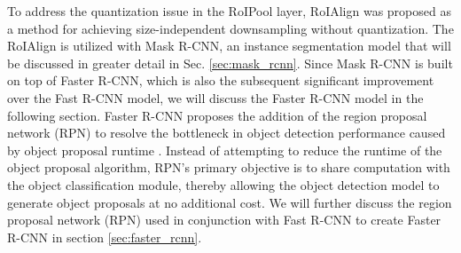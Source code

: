 To address the quantization issue in the RoIPool layer, RoIAlign was proposed as a method for achieving size-independent downsampling without quantization. The RoIAlign is utilized with Mask R-CNN, an instance segmentation model that will be discussed in greater detail in Sec. \ref{sec:mask_rcnn}. Since Mask R-CNN is built on top of Faster R-CNN, which is also the subsequent significant improvement over the Fast R-CNN model, we will discuss the Faster R-CNN model in the following section. Faster R-CNN proposes the addition of the region proposal network (RPN) to resolve the bottleneck in object detection performance caused by object proposal runtime \cite{faster_rcnn_2015}. Instead of attempting to reduce the runtime of the object proposal algorithm, RPN's primary objective is to share computation with the object classification module, thereby allowing the object detection model to generate object proposals at no additional cost. We will further discuss the region proposal network (RPN) used in conjunction with Fast R-CNN to create Faster R-CNN in section \ref{sec:faster_rcnn}.